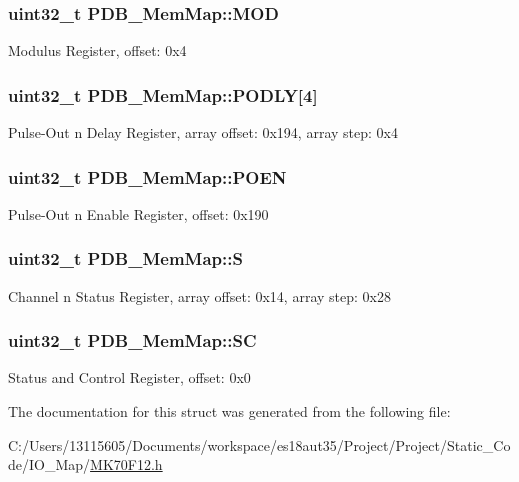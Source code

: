 \subsubsection[{M\+O\+D}]{\setlength{\rightskip}{0pt plus 5cm}uint32\+\_\+t P\+D\+B\+\_\+\+Mem\+Map\+::\+M\+O\+D}\label{struct_p_d_b___mem_map_a01bd648b1caa9b6626636fce386b496d}
Modulus Register, offset\+: 0x4 \hypertarget{struct_p_d_b___mem_map_a69081c41b606ea7a699a67e266a785d5}{}
\subsubsection[{P\+O\+D\+L\+Y}]{\setlength{\rightskip}{0pt plus 5cm}uint32\+\_\+t P\+D\+B\+\_\+\+Mem\+Map\+::\+P\+O\+D\+L\+Y\mbox{[}4\mbox{]}}\label{struct_p_d_b___mem_map_a69081c41b606ea7a699a67e266a785d5}
Pulse-\/\+Out n Delay Register, array offset\+: 0x194, array step\+: 0x4 \hypertarget{struct_p_d_b___mem_map_a259dc7b16cc8f12022cb6a5befb1660c}{}
\subsubsection[{P\+O\+E\+N}]{\setlength{\rightskip}{0pt plus 5cm}uint32\+\_\+t P\+D\+B\+\_\+\+Mem\+Map\+::\+P\+O\+E\+N}\label{struct_p_d_b___mem_map_a259dc7b16cc8f12022cb6a5befb1660c}
Pulse-\/\+Out n Enable Register, offset\+: 0x190 \hypertarget{struct_p_d_b___mem_map_afbd33089148cbb97dedff82c1c91c46d}{}
\subsubsection[{S}]{\setlength{\rightskip}{0pt plus 5cm}uint32\+\_\+t P\+D\+B\+\_\+\+Mem\+Map\+::\+S}\label{struct_p_d_b___mem_map_afbd33089148cbb97dedff82c1c91c46d}
Channel n Status Register, array offset\+: 0x14, array step\+: 0x28 \hypertarget{struct_p_d_b___mem_map_a10fb0324a394cc747b6f7d8b4c811b57}{}
\subsubsection[{S\+C}]{\setlength{\rightskip}{0pt plus 5cm}uint32\+\_\+t P\+D\+B\+\_\+\+Mem\+Map\+::\+S\+C}\label{struct_p_d_b___mem_map_a10fb0324a394cc747b6f7d8b4c811b57}
Status and Control Register, offset\+: 0x0 

The documentation for this struct was generated from the following file\+:\begin{DoxyCompactItemize}
\item 
C\+:/\+Users/13115605/\+Documents/workspace/es18aut35/\+Project/\+Project/\+Static\+\_\+\+Code/\+I\+O\+\_\+\+Map/\hyperlink{_m_k70_f12_8h}{M\+K70\+F12.\+h}\end{DoxyCompactItemize}
